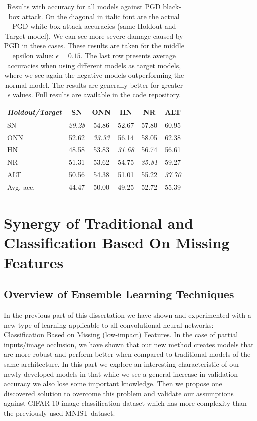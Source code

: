 \documentclass[b5paper]{book}
\begin{document}
\begin{table}[ht]
  \centering
  \begin{tabular}{l|ccccc}
    \toprule
     \textit{Holdout/Target} & SN & ONN & HN & NR & ALT \\
    \midrule
     SN & \textit{{29.28}} & {54.86} & {52.67} & {57.80} & {60.95} \\
     ONN & {52.62} & \textit{{33.33}} & {56.14} & {58.05} & {62.38}  \\
     HN & {48.58} & {53.83} & \textit{{31.68}} & {56.74} & {56.61} \\
     NR &{51.31} & {53.62} & {54.75} & \textit{{35.81}} & {59.27} \\ 
     ALT & {50.56} & {54.38} & {51.01} & {55.22} & \textit{{37.70}} \\
    \midrule 
     Avg. acc. & {44.47} & {50.00} & {49.25} & {52.72} & {55.39} \\
    \bottomrule
  \end{tabular}
  \caption{Results with accuracy for all models against PGD black-box attack. On the diagonal in italic font are the actual PGD white-box attack accuracies (same Holdout and Target model). We can see more severe damage caused by PGD in these cases. These results are taken for the middle epsilon value: \(\epsilon = 0.15 \). The last row presents average accuracies when using different models as target models, where we see again the negative models outperforming the normal model. The results are generally better for greater \(\epsilon\) values. Full results are available in the code repository.}
  \label{tab:results-pgd}
\end{table} 

\part{Synergy of Traditional and Classification Based On Missing Features}
\chapter{Overview of Ensemble Learning Techniques}

In the previous part of this dissertation we have shown and experimented with a new type of learning applicable to all convolutional neural networks: Classification Based on Missing (low-impact) Features. In the case of partial inputs/image occlusion, we have shown that our new method creates models that are more robust and perform better when compared to traditional models of the same architecture. In this part we explore an interesting characteristic of our newly developed models in that while we see a general increase in validation accuracy we also lose some important knowledge. Then we propose one discovered solution to overcome this problem and validate our assumptions against CIFAR-10 image classification dataset which has more complexity than the previously used MNIST dataset.
\end{document}
